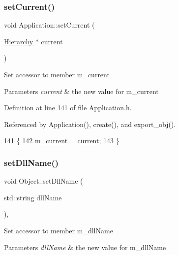 \subsubsection{\texorpdfstring{set\+Current()}{setCurrent()}}
{\footnotesize\ttfamily void Application\+::set\+Current (\begin{DoxyParamCaption}\item[{\hyperlink{classHierarchy}{Hierarchy} $\ast$}]{current }\end{DoxyParamCaption})\hspace{0.3cm}{\ttfamily [inline]}}

Set accessor to member m\+\_\+current 
\begin{DoxyParams}{Parameters}
{\em current} & the new value for m\+\_\+current \\
\hline
\end{DoxyParams}


Definition at line 141 of file Application.\+h.



Referenced by Application(), create(), and export\+\_\+obj().


\begin{DoxyCode}
141                                        \{
142     \hyperlink{classApplication_ab0fd877a3c66c41b22109863e1719ccd}{m\_current} = \hyperlink{classApplication_af25c880ff1e95d863ed058396754a76e}{current};
143   \}
\end{DoxyCode}
\mbox{\label{classObject_a870c5af919958c2136623b2d7816d123}} 
\subsubsection{\texorpdfstring{set\+Dll\+Name()}{setDllName()}}
{\footnotesize\ttfamily void Object\+::set\+Dll\+Name (\begin{DoxyParamCaption}\item[{std\+::string}]{dll\+Name }\end{DoxyParamCaption})\hspace{0.3cm}{\ttfamily [inline]}, {\ttfamily [inherited]}}

Set accessor to member m\+\_\+dll\+Name 
\begin{DoxyParams}{Parameters}
{\em dll\+Name} & the new value for m\+\_\+dll\+Name \\
\hline
\end{DoxyParams}


